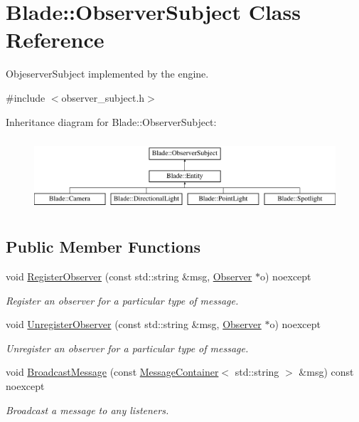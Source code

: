 \hypertarget{class_blade_1_1_observer_subject}{}\section{Blade\+:\+:Observer\+Subject Class Reference}
\label{class_blade_1_1_observer_subject}


Objeserver\+Subject implemented by the engine.  




{\ttfamily \#include $<$observer\+\_\+subject.\+h$>$}

Inheritance diagram for Blade\+:\+:Observer\+Subject\+:\begin{figure}[H]
\begin{center}
\leavevmode
\includegraphics[height=2.727273cm]{class_blade_1_1_observer_subject}
\end{center}
\end{figure}
\subsection*{Public Member Functions}
\begin{DoxyCompactItemize}
\item 
void \hyperlink{class_blade_1_1_observer_subject_af8e103e7a7cb33062ea5fbf189902272}{Register\+Observer} (const std\+::string \&msg, \hyperlink{class_blade_1_1_observer}{Observer} $\ast$o) noexcept
\begin{DoxyCompactList}\small\item\em Register an observer for a particular type of message. \end{DoxyCompactList}\item 
void \hyperlink{class_blade_1_1_observer_subject_a780cc6b90ee1b46fe936a8c712c41a58}{Unregister\+Observer} (const std\+::string \&msg, \hyperlink{class_blade_1_1_observer}{Observer} $\ast$o) noexcept
\begin{DoxyCompactList}\small\item\em Unregister an observer for a particular type of message. \end{DoxyCompactList}\item 
void \hyperlink{class_blade_1_1_observer_subject_a4d8b26a245fa28769456e5f54049b86b}{Broadcast\+Message} (const \hyperlink{class_blade_1_1_ref_counted_container}{Message\+Container}$<$ std\+::string $>$ \&msg) const noexcept
\begin{DoxyCompactList}\small\item\em Broadcast a message to any listeners. \end{DoxyCompactList}\end{DoxyCompactItemize}



